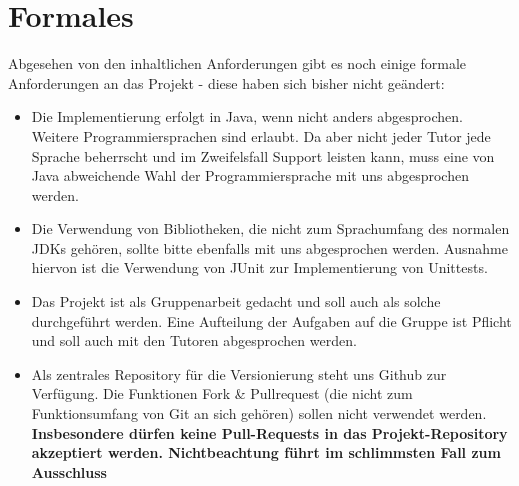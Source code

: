 \documentclass{programmierpraktikum}
\begin{document}
\section{Formales}
Abgesehen von den inhaltlichen Anforderungen gibt es noch einige formale Anforderungen an das Projekt - diese haben sich bisher nicht geändert:
\begin{itemize}
  \item Die Implementierung erfolgt in Java, wenn nicht anders abgesprochen. Wei\-te\-re Pro\-gram\-mier\-sprachen sind erlaubt. Da aber nicht jeder Tutor jede Sprache beherrscht und im Zweifelsfall Support leisten kann, muss eine von Java abweichende Wahl der Programmiersprache mit uns abgesprochen werden.
  \item Die Verwendung von Bibliotheken, die nicht zum Sprachumfang des normalen JDKs gehören, sollte bitte ebenfalls mit uns abgesprochen werden. Ausnahme hiervon ist die Verwendung von JUnit zur Implementierung von Unittests.
  \item Das Projekt ist als Gruppenarbeit gedacht und soll auch als solche durchgeführt werden. Eine Aufteilung der Aufgaben auf die Gruppe ist Pflicht und soll auch mit den Tutoren abgesprochen werden.
  \item Als zentrales Repository für die Versionierung steht uns Github zur Verfügung. Die Funktionen Fork \& Pullrequest (die nicht zum Funktionsumfang von Git an sich gehören) sollen nicht verwendet werden. \textbf{Insbesondere dürfen keine Pull-Requests in das Projekt-Repository akzeptiert werden. Nichtbeachtung führt im schlimmsten Fall zum Ausschluss}
\end{itemize}
\end{document}
